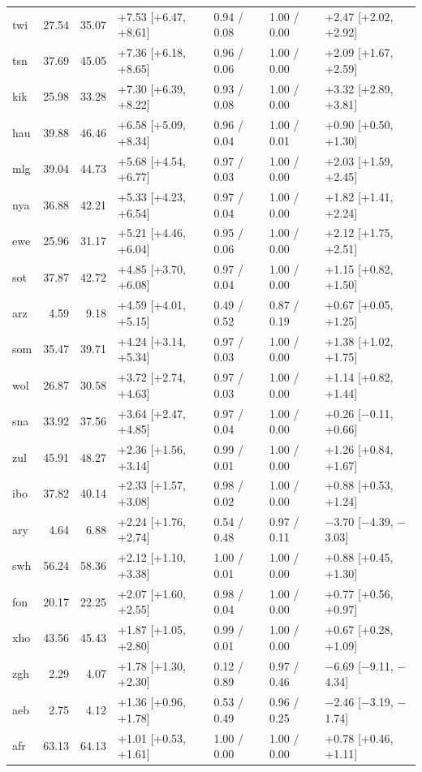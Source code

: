 {\begin{longtable}{@{}lrrllll@{}}
twi & 27.54 & 35.07 & +7.53 [+6.47, +8.61] & 0.94 / 0.08 & 1.00 / 0.00 & +2.47 [+2.02, +2.92] \\
tsn & 37.69 & 45.05 & +7.36 [+6.18, +8.65] & 0.96 / 0.06 & 1.00 / 0.00 & +2.09 [+1.67, +2.59] \\
kik & 25.98 & 33.28 & +7.30 [+6.39, +8.22] & 0.93 / 0.08 & 1.00 / 0.00 & +3.32 [+2.89, +3.81] \\
hau & 39.88 & 46.46 & +6.58 [+5.09, +8.34] & 0.96 / 0.04 & 1.00 / 0.01 & +0.90 [+0.50, +1.30] \\
mlg & 39.04 & 44.73 & +5.68 [+4.54, +6.77] & 0.97 / 0.03 & 1.00 / 0.00 & +2.03 [+1.59, +2.45] \\
nya & 36.88 & 42.21 & +5.33 [+4.23, +6.54] & 0.97 / 0.04 & 1.00 / 0.00 & +1.82 [+1.41, +2.24] \\
ewe & 25.96 & 31.17 & +5.21 [+4.46, +6.04] & 0.95 / 0.06 & 1.00 / 0.00 & +2.12 [+1.75, +2.51] \\
sot & 37.87 & 42.72 & +4.85 [+3.70, +6.08] & 0.97 / 0.04 & 1.00 / 0.00 & +1.15 [+0.82, +1.50] \\
arz & 4.59 & 9.18 & +4.59 [+4.01, +5.15] & 0.49 / 0.52 & 0.87 / 0.19 & +0.67 [+0.05, +1.25] \\
som & 35.47 & 39.71 & +4.24 [+3.14, +5.34] & 0.97 / 0.03 & 1.00 / 0.00 & +1.38 [+1.02, +1.75] \\
wol & 26.87 & 30.58 & +3.72 [+2.74, +4.63] & 0.97 / 0.03 & 1.00 / 0.00 & +1.14 [+0.82, +1.44] \\
sna & 33.92 & 37.56 & +3.64 [+2.47, +4.85] & 0.97 / 0.04 & 1.00 / 0.00 & +0.26 [\ensuremath{-}0.11, +0.66] \\
zul & 45.91 & 48.27 & +2.36 [+1.56, +3.14] & 0.99 / 0.01 & 1.00 / 0.00 & +1.26 [+0.84, +1.67] \\
ibo & 37.82 & 40.14 & +2.33 [+1.57, +3.08] & 0.98 / 0.02 & 1.00 / 0.00 & +0.88 [+0.53, +1.24] \\
ary & 4.64 & 6.88 & +2.24 [+1.76, +2.74] & 0.54 / 0.48 & 0.97 / 0.11 & \ensuremath{-}3.70 [\ensuremath{-}4.39, \ensuremath{-}3.03] \\
swh & 56.24 & 58.36 & +2.12 [+1.10, +3.38] & 1.00 / 0.01 & 1.00 / 0.00 & +0.88 [+0.45, +1.30] \\
fon & 20.17 & 22.25 & +2.07 [+1.60, +2.55] & 0.98 / 0.04 & 1.00 / 0.00 & +0.77 [+0.56, +0.97] \\
xho & 43.56 & 45.43 & +1.87 [+1.05, +2.80] & 0.99 / 0.01 & 1.00 / 0.00 & +0.67 [+0.28, +1.09] \\
zgh & 2.29 & 4.07 & +1.78 [+1.30, +2.30] & 0.12 / 0.89 & 0.97 / 0.46 & \ensuremath{-}6.69 [\ensuremath{-}9.11, \ensuremath{-}4.34] \\
aeb & 2.75 & 4.12 & +1.36 [+0.96, +1.78] & 0.53 / 0.49 & 0.96 / 0.25 & \ensuremath{-}2.46 [\ensuremath{-}3.19, \ensuremath{-}1.74] \\
afr & 63.13 & 64.13 & +1.01 [+0.53, +1.61] & 1.00 / 0.00 & 1.00 / 0.00 & +0.78 [+0.46, +1.11] \\
\end{longtable}
}

